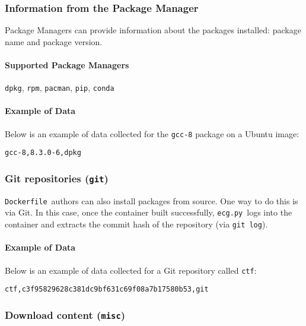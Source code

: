\documentclass{article}
\newcommand{\dfile}{\texttt{Dockerfile}}
\newcommand{\ecg}{\texttt{ecg.py}}
\begin{document}
\subsubsection{Information from the Package Manager}\label{sec:package_managers}

Package Managers can provide information about the packages installed: package name and package version.

\paragraph{Supported Package Managers} \texttt{dpkg}, \texttt{rpm}, \texttt{pacman}, \texttt{pip}, \texttt{conda}

\paragraph{Example of Data}

Below is an example of data collected for the \texttt{gcc-8} package on a Ubuntu image:

\begin{lstlisting}
gcc-8,8.3.0-6,dpkg
\end{lstlisting}

\subsubsection{Git repositories (\texttt{git})}\label{sec:git}

\dfile\ authors can also install packages from source.
One way to do this is via Git.
In this case, once the container built successfully, \ecg\ logs into the container and extracts the commit hash of the repository (via \texttt{git log}).

\paragraph{Example of Data}

Below is an example of data collected for a Git repository called \texttt{ctf}:

\begin{lstlisting}
ctf,c3f95829628c381dc9bf631c69f08a7b17580b53,git
\end{lstlisting}

\subsubsection{Download content (\texttt{misc})}\label{sec:misc}
\end{document}
